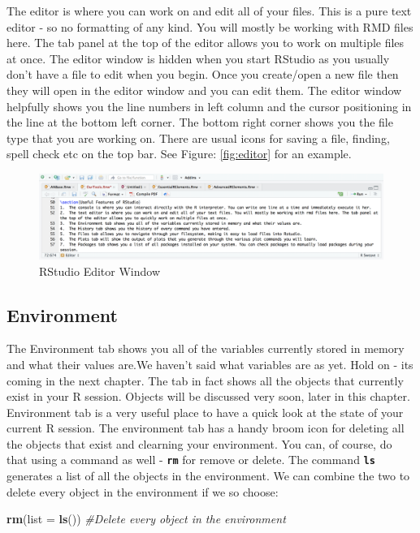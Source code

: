 \documentclass[]{krantz}
\makeatletter
\newenvironment{Shaded}{\begin{snugshade}}{\end{snugshade}}
\newcommand{\KeywordTok}[1]{\textcolor[rgb]{0.27,0.27,0.27}{\textbf{#1}}}
\newcommand{\DataTypeTok}[1]{\textcolor[rgb]{0.27,0.27,0.27}{#1}}
\newcommand{\CommentTok}[1]{\textcolor[rgb]{0.56,0.35,0.01}{\textit{#1}}}
\newcommand{\NormalTok}[1]{#1}
\newenvironment{kframe}{%
\medskip{}
\setlength{\fboxsep}{.8em}
 \def\at@end@of@kframe{}%
 \ifinner\ifhmode%
  \def\at@end@of@kframe{\end{minipage}}%
  \begin{minipage}{\columnwidth}%
 \fi\fi%
 \def\FrameCommand##1{\hskip\@totalleftmargin \hskip-\fboxsep
 \colorbox{shadecolor}{##1}\hskip-\fboxsep
     \hskip-\linewidth \hskip-\@totalleftmargin \hskip\columnwidth}%
 \MakeFramed {\advance\hsize-\width
   \@totalleftmargin\z@ \linewidth\hsize
   \@setminipage}}%
 {\par\unskip\endMakeFramed%
 \at@end@of@kframe}
\renewenvironment{Shaded}{\begin{kframe}}{\end{kframe}}
\theoremstyle{definition}
\theoremstyle{definition}
\theoremstyle{definition}
\theoremstyle{remark}
\makeatother
\begin{document}
The editor is where you can work on and edit all of your files. This is
a pure text editor - so no formatting of any kind. You will mostly be
working with RMD files here. The tab panel at the top of the editor
allows you to work on multiple files at once. The editor window is
hidden when you start RStudio as you usually don't have a file to edit
when you begin. Once you create/open a new file then they will open in
the editor window and you can edit them. The editor window helpfully
shows you the line numbers in left column and the cursor positioning in
the line at the bottom left corner. The bottom right corner shows you
the file type that you are working on. There are usual icons for saving
a file, finding, spell check etc on the top bar. See Figure:
\ref{fig:editor} for an example.

\begin{figure}
\centering
\includegraphics{images/editor.png}
\caption{RStudio Editor Window}
\end{figure}

\subsection{Environment}\label{environment}

The Environment tab shows you all of the variables currently stored in
memory and what their values are.We haven't said what variables are as
yet. Hold on - its coming in the next chapter. The tab in fact shows all
the objects that currently exist in your R session. Objects will be
discussed very soon, later in this chapter. Environment tab is a very
useful place to have a quick look at the state of your current R
session. The environment tab has a handy broom icon for deleting all the
objects that exist and clearning your environment. You can, of course,
do that using a command as well - \textbf{\texttt{rm}} for remove or
delete. The command \textbf{\texttt{ls}} generates a list of all the
objects in the environment. We can combine the two to delete every
object in the environment if we so choose:

\begin{Shaded}
\begin{Highlighting}[]
\KeywordTok{rm}\NormalTok{(}\DataTypeTok{list =} \KeywordTok{ls}\NormalTok{()) }\CommentTok{#Delete every object in the environment}
\end{Highlighting}
\end{Shaded}
\end{document}
